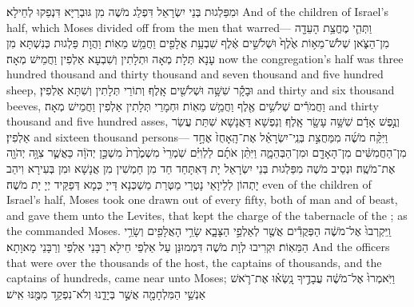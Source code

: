 {וּמִפַּלְגוּת בְּנֵי יִשְׂרָאֵל דִּפְלַג מֹשֶׁה מִן גּוּבְרַיָּא דִּנְפַקוּ לְחֵילָא׃}
{And of the children of Israel’s half, which Moses divided off from the men that warred—}{}
{וַתְּהִ֛י מֶחֱצַ֥ת הָעֵדָ֖ה מִן־הַצֹּ֑אן שְׁלֹשׁ־מֵא֥וֹת אֶ֙לֶף֙ וּשְׁלֹשִׁ֣ים אֶ֔לֶף שִׁבְעַ֥ת אֲלָפִ֖ים וַחֲמֵ֥שׁ מֵאֽוֹת׃
}
{וַהֲוָת פַּלְגוּת כְּנִשְׁתָּא מִן עָנָא תְּלָת מְאָה וּתְלָתִין וְשִׁבְעָא אַלְפִין וַחֲמֵישׁ מְאָה׃}
{now the congregation’s half was three hundred thousand and thirty thousand and seven thousand and five hundred sheep,}{}
{וּבָקָ֕ר שִׁשָּׁ֥ה וּשְׁלֹשִׁ֖ים אָֽלֶף׃}
{וְתוֹרֵי תְּלָתִין וְשִׁתָּא אַלְפִין׃}
{and thirty and six thousand beeves,}{}
{וַחֲמֹרִ֕ים שְׁלֹשִׁ֥ים אֶ֖לֶף וַחֲמֵ֥שׁ מֵאֽוֹת׃}
{וּחְמָרֵי תְּלָתִין אַלְפִין וַחֲמֵישׁ מְאָה׃}
{and thirty thousand and five hundred asses,}{}
{וְנֶ֣פֶשׁ אָדָ֔ם שִׁשָּׁ֥ה עָשָׂ֖ר אָֽלֶף׃}
{וְנַפְשָׁא דַּאֲנָשָׁא שִׁתַּת עֲשַׂר אַלְפִין׃}
{and sixteen thousand persons—}{}
{וַיִּקַּ֨ח מֹשֶׁ֜ה מִמַּחֲצִ֣ת בְּנֵֽי־יִשְׂרָאֵ֗ל אֶת־הָֽאָחֻז֙ אֶחָ֣ד מִן־הַחֲמִשִּׁ֔ים מִן־הָאָדָ֖ם וּמִן־הַבְּהֵמָ֑ה וַיִּתֵּ֨ן אֹתָ֜ם לַלְוִיִּ֗ם שֹֽׁמְרֵי֙ מִשְׁמֶ֙רֶת֙ מִשְׁכַּ֣ן יְהֹוָ֔ה כַּאֲשֶׁ֛ר צִוָּ֥ה יְהֹוָ֖ה אֶת־מֹשֶֽׁה׃
}
{וּנְסֵיב מֹשֶׁה מִפַּלְגוּת בְּנֵי יִשְׂרָאֵל יָת דְּאִתָּחַד חַד מִן חַמְשִׁין מִן אֲנָשָׁא וּמִן בְּעִירָא וִיהַב יָתְהוֹן לְלֵיוָאֵי נָטְרֵי מַטְּרַת מַשְׁכְּנָא דַּייָ כְּמָא דְּפַקֵּיד יְיָ יָת מֹשֶׁה׃}
{even of the children of Israel’s half, Moses took one drawn out of every fifty, both of man and of beast, and gave them unto the Levites, that kept the charge of the tabernacle of the \lord; as the \lord\space commanded Moses.}{}
{וַֽיִּקְרְבוּ֙ אֶל־מֹשֶׁ֔ה הַפְּקֻדִ֕ים אֲשֶׁ֖ר לְאַלְפֵ֣י הַצָּבָ֑א שָׂרֵ֥י הָאֲלָפִ֖ים וְשָׂרֵ֥י הַמֵּאֽוֹת׃
}
{וּקְרִיבוּ לְוָת מֹשֶׁה דִּמְמוּנַּן עַל אַלְפֵי חֵילָא רַבָּנֵי אַלְפֵי וְרַבָּנֵי מָאוָתָא׃}
{And the officers that were over the thousands of the host, the captains of thousands, and the captains of hundreds, came near unto Moses;}{}
{וַיֹּֽאמְרוּ֙ אֶל־מֹשֶׁ֔ה עֲבָדֶ֣יךָ נָֽשְׂא֗וּ אֶת־רֹ֛אשׁ אַנְשֵׁ֥י הַמִּלְחָמָ֖ה אֲשֶׁ֣ר בְּיָדֵ֑נוּ וְלֹא־נִפְקַ֥ד מִמֶּ֖נּוּ אִֽישׁ׃
}

